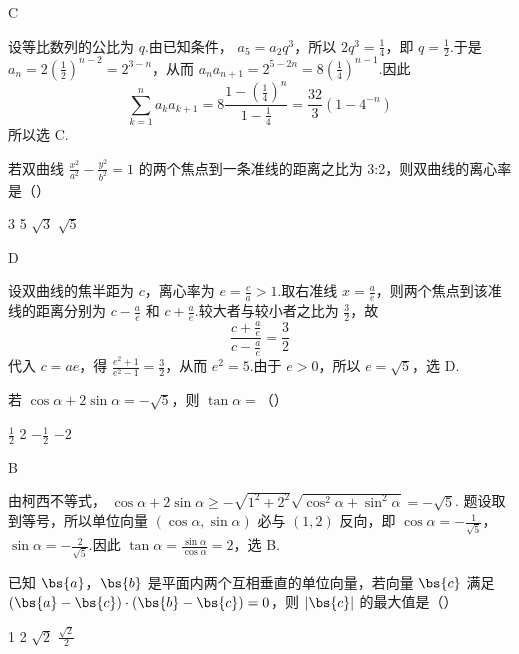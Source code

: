 \begin{answer}
C
\end{answer}

\begin{solution}
设等比数列的公比为 \(q\).由已知条件，
\(a_5=a_2q^3\)，所以 \(2q^3=\frac14\)，即 \(q=\frac12\).于是
\(a_n=2\left(\frac12\right)^{n-2}=2^{3-n}\)，从而
\(a_na_{n+1}=2^{5-2n}=8\left(\frac14\right)^{n-1}\).因此
\[
\sum_{k=1}^{n}a_ka_{k+1}=8\frac{1-\left(\frac14\right)^n}{1-\frac14}=\frac{32}{3}(1-4^{-n})
\]
所以选 C.
\end{solution}

\begin{problem}
若双曲线 \(\frac{x^2}{a^2} - \frac{y^2}{b^2} = 1\) 的两个焦点到一条准线的距离之比为 3:2，则双曲线的离心率是（\quad）

\choices
    {3}
    {5}
    {\( \sqrt{3} \)}
    {\( \sqrt{5} \)}
\end{problem}

\begin{answer}
D
\end{answer}

\begin{solution}
设双曲线的焦半距为 \(c\)，离心率为 \(e=\frac ca>1\).取右准线
\(x=\frac ae\)，则两个焦点到该准线的距离分别为
\(c-\frac ae\) 和 \(c+\frac ae\).较大者与较小者之比为 \(\frac32\)，故
\[
\frac{c+\frac ae}{c-\frac ae}=\frac32
\]
代入 \(c=ae\)，得 \(\frac{e^2+1}{e^2-1}=\frac32\)，从而 \(e^2=5\).由于 \(e>0\)，所以 \(e=\sqrt5\)，选 D.
\end{solution}

\begin{problem}
若 \(\cos \alpha + 2\sin \alpha = -\sqrt{5}\)，则 \(\tan \alpha =\)（\quad）

\choices
    {\( \frac{1}{2} \)}
    {2}
    {\(-\frac{1}{2}\)}
    {\(-2\)}
\end{problem}

\begin{answer}
B
\end{answer}

\begin{solution}
由柯西不等式，
\(\cos\alpha+2\sin\alpha\geqslant-\sqrt{1^2+2^2}\sqrt{\cos^2\alpha+\sin^2\alpha}=-\sqrt5\).
题设取到等号，所以单位向量 \((\cos\alpha,\sin\alpha)\) 必与 \((1,2)\) 反向，即
\(\cos\alpha=-\frac1{\sqrt5}\)，\(\sin\alpha=-\frac2{\sqrt5}\).因此
\(\tan\alpha=\frac{\sin\alpha}{\cos\alpha}=2\)，选 B.
\end{solution}

\begin{problem}
已知 \(\bs{a}\)，\(\bs{b}\) 是平面内两个互相垂直的单位向量，若向量 \(\bs{c}\) 满足 \((\bs{a} - \bs{c}) \cdot (\bs{b} - \bs{c}) = 0\)，则 \(|\bs{c}|\) 的最大值是（\quad）

\choices
    {1}
    {2}
    {\(\sqrt{2}\)}
    {\(\frac{\sqrt{2}}{2}\)}
\end{problem}

